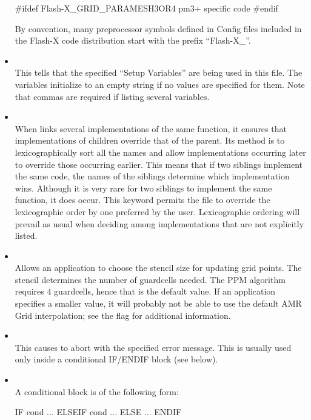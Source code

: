\begin{itemize}
\begin{codeseg}
#ifdef Flash-X_GRID_PARAMESH3OR4
  pm3+ specific code
#endif
\end{codeseg}
By convention, many preprocessor symbols defined in Config
files included in the Flash-X code distribution
start with the prefix ``Flash-X\_''.

\item {}\\
This tells \setup that the specified ``Setup Variables'' are being used
in this  file. The variables initialize to an empty
string if no values are specified for them. Note that commas
are required if listing several variables.



\item {} \\
When  links several implementations of the same
function, it ensures that implementations of children override that
of the parent. Its method is to lexicographically sort all
the names and allow implementations occurring later to override
those occurring earlier. This means that if two siblings
implement the same code, the names of the siblings determine which
implementation wins. Although it is very rare for two siblings to
implement the same function, it does occur. This keyword permits the
 file to override the lexicographic order by one
preferred by the user. Lexicographic ordering will prevail as usual
when deciding among implementations that are not explicitly listed.

\item {} \\
Allows an application to choose the stencil size for updating
grid points. The stencil determines the number of guardcells
needed. The PPM algorithm requires $4$ guardcells, hence that is the
default value.
If an application specifies a smaller value, it will probably not
be able to use the default  AMR Grid interpolation;
see the   flag for additional
information.

\item {}\\
This causes \setup to abort with the specified error message. This
is usually used only inside a conditional IF/ENDIF block (see below).

\item {}\\
A conditional block is of the following form:
\begin{codeseg}
IF cond
   ...
ELSEIF cond
   ...
ELSE
   ...
ENDIF
\end{codeseg}


\end{itemize}
